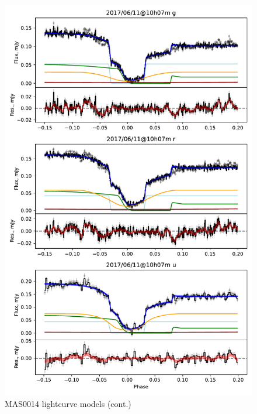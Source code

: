 \begin{figure}
    \centering
    \includegraphics[width=\textwidth]{figures/results/MASOT0014/MASOT0014_2.pdf}
    \caption{MAS0014 lightcurve models (cont.)}
    \label{fig:MAS0014 all lightcurves cont 1}
\end{figure}
